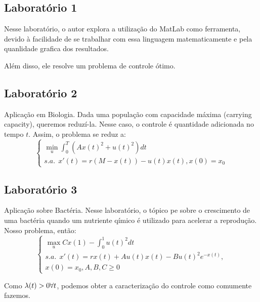 \subsection{Laboratório 1}

Nesse laboratório, o autor explora a utilização do MatLab como ferramenta, devido à facilidade de se trabalhar com essa linguagem matematicamente e pela quanlidade grafica dos resultados. 

Além disso, ele resolve um problema de controle ótimo. 

\subsection{Laboratório 2}

Aplicação em Biologia. Dada uma população com capacidade máxima (carrying capacity), queremos reduzí-la. Nesse caso, o controle é quantidade adicionada no tempo $t$. Assim, o problema se reduz a:
\begin{equation}
    \begin{cases}
    \min_u \int_0^T (Ax(t)^2 + u(t)^2) dt \\
    s.a.~~ x'(t) = r(M - x(t)) - u(t)x(t), x(0) = x_0
    \end{cases}
\end{equation}

\subsection{Laboratório 3}

Aplicação sobre Bactéria. Nesse laboratório, o tópico pe sobre o crescimento de uma bactéria quando um nutriente qímico é utilizado para acelerar a reprodução. Nosso problema, então:
\begin{equation}
    \begin{cases}
    \max_u Cx(1) - \int_0^1 u(t)^2 dt \\
    s.a.~~ x'(t) = rx(t) + Au(t)x(t) - Bu(t)^2e^{-x(t)}, \\
    x(0) = x_0, A, B, C \geq 0
    \end{cases}
\end{equation}

Como $\lambda(t) > 0 \forall t$, podemos obter a caracterização do controle como comumente fazemos.

